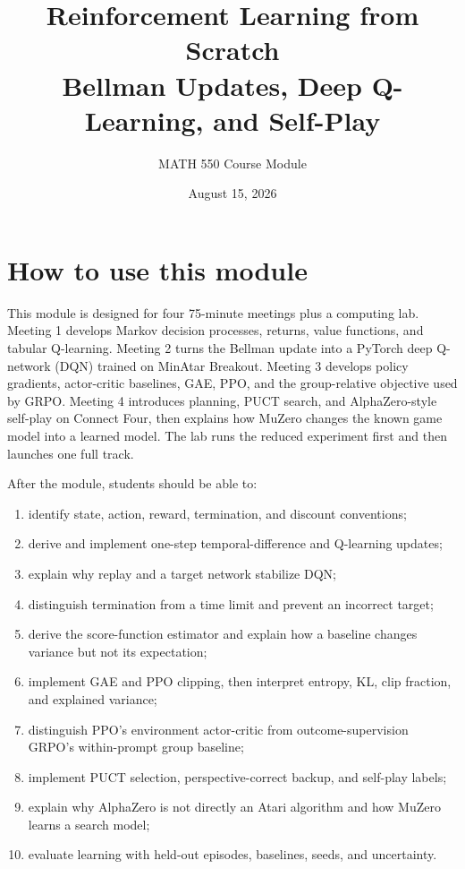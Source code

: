 \documentclass[11pt]{article}
\title{Reinforcement Learning from Scratch\\\large Bellman Updates, Deep Q-Learning, and Self-Play}
\author{MATH 550 Course Module}
\date{August 15, 2026}
\begin{document}
\maketitle
\tableofcontents

\section{How to use this module}

This module is designed for four 75-minute meetings plus a computing lab.
Meeting 1 develops Markov decision processes, returns, value functions, and
tabular Q-learning. Meeting 2 turns the Bellman update into a PyTorch deep
Q-network (DQN) trained on MinAtar Breakout. Meeting 3 develops policy gradients,
actor-critic baselines, GAE, PPO, and the group-relative objective used by GRPO.
Meeting 4 introduces planning,
PUCT search, and AlphaZero-style self-play on Connect Four, then explains how
MuZero changes the known game model into a learned model. The lab runs the
reduced experiment first and then launches one full track.

After the module, students should be able to:
\begin{enumerate}[label=\arabic*.]
\item identify state, action, reward, termination, and discount conventions;
\item derive and implement one-step temporal-difference and Q-learning updates;
\item explain why replay and a target network stabilize DQN;
\item distinguish termination from a time limit and prevent an incorrect target;
\item derive the score-function estimator and explain how a baseline changes
variance but not its expectation;
\item implement GAE and PPO clipping, then interpret entropy, KL, clip fraction,
and explained variance;
\item distinguish PPO's environment actor-critic from outcome-supervision GRPO's
within-prompt group baseline;
\item implement PUCT selection, perspective-correct backup, and self-play labels;
\item explain why AlphaZero is not directly an Atari algorithm and how MuZero
learns a search model;
\item evaluate learning with held-out episodes, baselines, seeds, and uncertainty.
\end{enumerate}
\end{document}
